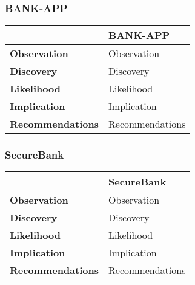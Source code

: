\subsubsection{BANK-APP}
\begin{tabular*}{\textwidth}{ l | p{} }\hline
    & \textbf{BANK-APP} \\ \hline
    \textbf{Observation} & Observation \\
    \textbf{Discovery} & Discovery \\
    \textbf{Likelihood} & Likelihood \\
    \textbf{Implication} & Implication \\
    \textbf{Recommendations} & Recommendations
\end{tabular*}

\subsubsection{SecureBank}
\begin{tabular*}{\textwidth}{ l | p{} }\hline
    & \textbf{SecureBank} \\ \hline
    \textbf{Observation} & Observation \\
    \textbf{Discovery} & Discovery \\
    \textbf{Likelihood} & Likelihood \\
    \textbf{Implication} & Implication \\
    \textbf{Recommendations} & Recommendations
\end{tabular*}
\clearpage